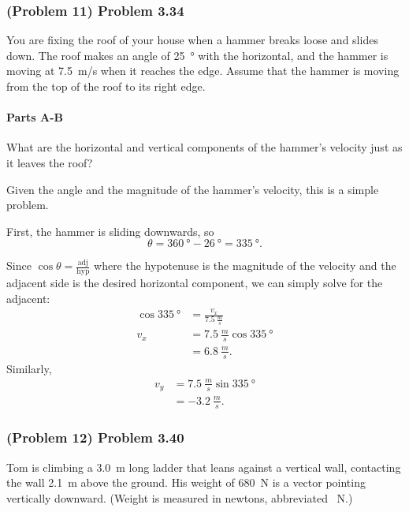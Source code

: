 \newpage

\subsubsection{(Problem 11) Problem 3.34}

You are fixing the roof of your house when a hammer breaks loose and slides down. The roof makes an angle of \SI{25}{\degree} with the horizontal, and the hammer is moving at \SI{7.5}{m/s} when it reaches the edge. Assume that the hammer is moving from the top of the roof to its right edge.

\setcounter{partcounter}{2}
\paragraph{Parts A-B}

What are the horizontal and vertical components of the hammer's velocity just as it leaves the roof?

\begin{solution}
	Given the angle and the magnitude of the hammer's velocity, this is a simple problem.

	First, the hammer is sliding downwards, so
	\[
		\theta = \SI{360}{\degree} - \SI{26}{\degree} = \SI{335}{\degree}
		.\]

	Since $\cos \theta = \frac{\text{adj}}{\text{hyp}}$ where the hypotenuse is the magnitude of the velocity and the adjacent side is the desired  horizontal component, we can simply solve for the adjacent:
	\begin{align*}
		\cos \SI{335}{\degree} &= \frac{v_x}{\SI{7.5}{\frac{m}{s}}} \\
		v_x &= \SI{7.5}{\frac{m}{s}} \cos \SI{335}{\degree} \\
		&= \SI{6.8}{\frac{m}{s}}
		.\end{align*}
	Similarly,
	\begin{align*}
		v_y &= \SI{7.5}{\frac{m}{s}} \sin \SI{335}{\degree} \\
		&= \SI{-3.2}{\frac{m}{s}}
		.\end{align*}
\end{solution}

\newpage

\subsubsection{(Problem 12) Problem 3.40}

Tom is climbing a \SI{3.0}{m} long ladder that leans against a vertical wall, contacting the wall \SI{2.1}{m} above the ground. His weight of  \SI{680}{N} is a vector pointing vertically downward. (Weight is measured in newtons, abbreviated \SI{}{N}.)

